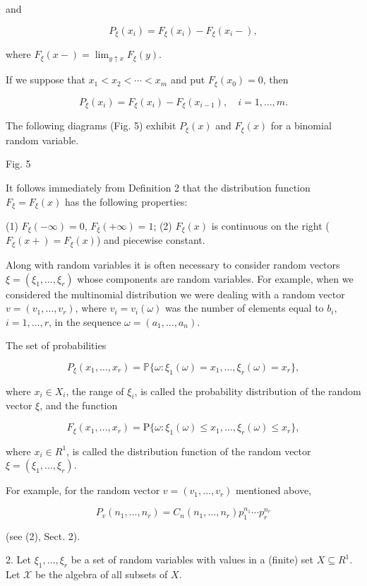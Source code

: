 and

$$P_{\xi}(x_i) = F_{\xi}(x_i) - F_{\xi}(x_i -),$$

where $F_{\xi}(x -) = \lim_{y \uparrow x} F_{\xi}(y)$.

If we suppose that $x_1 < x_2 < \cdots < x_m$ and put $F_{\xi}(x_0) = 0$, then

$$P_{\xi}(x_i) = F_{\xi}(x_i) - F_{\xi}(x_{i-1}), \quad i = 1, \ldots, m.$$

The following diagrams (Fig. 5) exhibit $P_{\xi}(x)$ and $F_{\xi}(x)$ for a binomial random variable.

Fig. 5

It follows immediately from Definition 2 that the distribution function $F_{\xi} = F_{\xi}(x)$ has the following properties:

(1) $F_{\xi}(-\infty) = 0$, $F_{\xi}(+\infty) = 1$;
(2) $F_{\xi}(x)$ is continuous on the right ($F_{\xi}(x+) = F_{\xi}(x)$) and piecewise constant.

Along with random variables it is often necessary to consider random vectors $\xi = (\xi_1, \ldots, \xi_r)$ whose components are random variables. For example, when we considered the multinomial distribution we were dealing with a random vector $v = (v_1, \ldots, v_r)$, where $v_i = v_i(\omega)$ was the number of elements equal to $b_i$, $i = 1, \ldots, r$, in the sequence $\omega = (a_1, \ldots, a_n)$.

The set of probabilities

$$P_{\xi}(x_1, \ldots, x_r) = \mathbb{P}\{\omega : \xi_1(\omega) = x_1, \ldots, \xi_r(\omega) = x_r\},$$

where $x_i \in X_i$, the range of $\xi_i$, is called the probability distribution of the random vector $\xi$, and the function

$$F_\xi(x_1, \ldots, x_r) = \text{P}\{\omega : \xi_1(\omega) \leq x_1, \ldots, \xi_r(\omega) \leq x_r\},$$

where $x_i \in R^1$, is called the distribution function of the random vector $\xi = (\xi_1, \ldots, \xi_r)$.

For example, for the random vector $v = (v_1, \ldots, v_r)$ mentioned above,

$$P_v(n_1, \ldots, n_r) = C_n(n_1, \ldots, n_r)p_1^{n_1} \cdots p_r^{n_r}$$

(see (2), Sect. 2).

2. Let $\xi_1, \ldots, \xi_r$ be a set of random variables with values in a (finite) set $X \subseteq R^1$. Let $\mathcal{X}$ be the algebra of all subsets of $X$.
